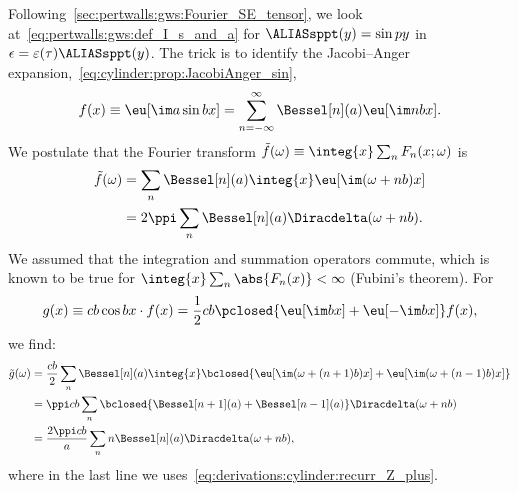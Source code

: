 



\newcommand{\sppt}{\ALIASsppt}



Following~\cref{sec:pertwalls:gws:Fourier_SE_tensor}, we look at~\cref{eq:pertwalls:gws:def_I_s_and_a} for $\sppt(y)=\sin{py}$ in $\epsilon= \varepsilon(\tau) \sppt(y)$. 
The trick is to identify the Jacobi--Anger expansion,~\cref{eq:cylinder:prop:JacobiAnger_sin},
\begin{equation}
    f(x) \equiv\eu[\im a \sin{bx}] = \sum_{n=-\infty}^{\infty} \Bessel[n](a) \eu[\im n bx].
\end{equation}
We postulate that the Fourier transform $\tilde{f}(\omega)\equiv\integ{x} \sum_{n} F_n(x;\omega)$ is 
\begin{align}
    \tilde{f}(\omega) &= %
        \sum_{n} \Bessel[n](a) \integ{x}\eu[\im (\omega+ nb)x]\nonumber \\
        &= 2\ppi  \sum_{n} \Bessel[n](a) \Diracdelta(\omega + nb).
\end{align}
We assumed that the %
integration and summation operators commute, which is known to be true for $\integ{x}\sum_{n}\abs{F_n(x)} < \infty$ (Fubini's theorem).  
For %
\begin{equation}
    g(x)\equiv cb \cos{bx} \cdot f(x) = \frac{1}{2}cb \pclosed{\eu[\im bx] + \eu[-\im bx] } f(x),
\end{equation}
we find:
\begin{align}
    \tilde{g}(\omega) &= 
    \frac{cb}{2}\sum_{n} \Bessel[n](a) \integ{x} \bclosed{\eu[\im (\omega+ (n+1)b)x] +\eu[\im (\omega+ (n-1)b)x] }\nonumber \\
    &= \ppi cb \sum_{n} \bclosed{ \Bessel[n+1](a) +  \Bessel[n-1](a)} \Diracdelta(\omega + nb ) \nonumber \\
    &= \frac{2\ppi cb}{a} \sum_n n \Bessel[n](a) \Diracdelta(\omega + nb ),
\end{align}
where in the last line we uses~\cref{eq:derivations:cylinder:recurr_Z_plus}. 

